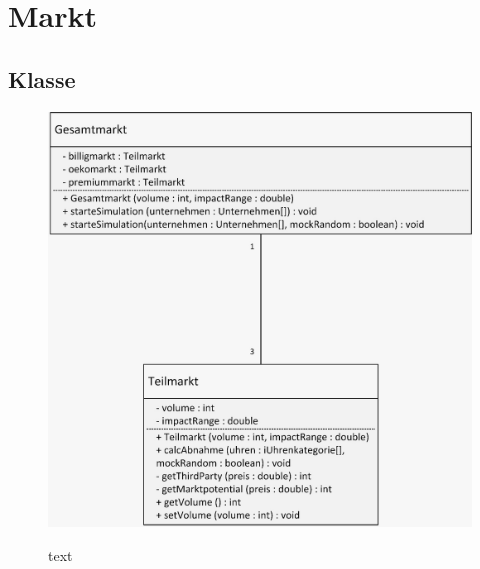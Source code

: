 \clearpage
\chapter{Markt} \label{KapitelMarkt}
\section{Klasse}
\begin{figure} [!h]
	\centering
	\includegraphics[scale=0.3]{img/Markt.jpeg} 
	\label{key}
	\caption{text}
\end{figure}
\clearpage
